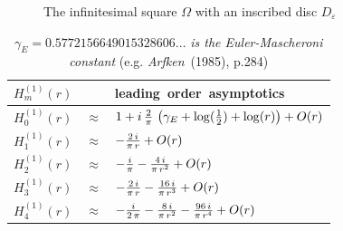 \begin{figure}
\HideDisplacementBoxes
\centerline{}
\caption{The infinitesimal square $\Omega$ with an inscribed disc 
$D_{\varepsilon}$}
\protect\label{Omegaeps}
\end{figure}

\begin{table}
\begin{minipage} {90.0mm}
\begin{tabular*}{85mm}{ccl}\hline
$H^{(1)}_m(r)$&&\mbox{leading order asymptotics}\\ \hline
$H^{(1)}_0(r)$&$\approx$&$1 + i\,{{2}\over {\pi }}\,\left( \gamma_{E} + 
     {{ \log ({1\over 2}) + \log (r)  }} \right)+O(r)$\\
$H^{(1)}_1(r)$&$\approx$&$-{{2\,i}\over {\pi \,r}}+O(r)$\\
$H^{(1)}_2(r)$&$\approx$&$-{i\over {\pi }} - {4\,i\over {\pi \,{r^2}}}
+O(r)$\\
$H^{(1)}_3(r)$&$\approx$&$ - {2\,i\over {\pi \,r}} -{{16\,i}\over {\pi \,{r^3}}}
+O(r)$\\
$H^{(1)}_4(r)$&$\approx$&$-{{i}\over {2\,\pi }} - {8\,i\over {\pi 
\,{r^2}}}  - {{96\,i}\over {\pi \,{r^4}}}
+O(r)$\\
\hline
\end{tabular*}
\caption{\label{HTable} {$\gamma_{E}=0.5772156649015328606...$ {\em is the
 Euler-Mascheroni constant\/} (e.g. {\em Arfken\/}~(1985), p.284)}}
\end{minipage}
\end{table} 


